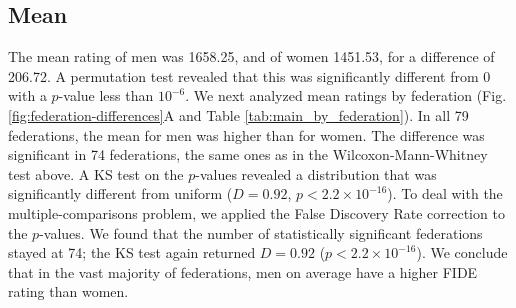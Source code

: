\documentclass[9pt,twocolumn,twoside,lineno]{pnas-new}
\begin{document}
\subsection*{Mean}
The mean rating of men was 1658.25, and of women 1451.53, for a difference of 206.72.  A permutation test revealed that this was significantly different from 0 with a $p$-value less than $10^{-6}$.  We next analyzed mean ratings by federation (Fig. \ref{fig:federation-differences}A and Table \ref{tab:main_by_federation}). In all 79 federations, the mean for men was higher than for women. The difference was significant in 74  federations, the same ones as in the Wilcoxon-Mann-Whitney test above. A KS test on the $p$-values revealed a distribution that was significantly different from uniform ($D = 0.92$, $p < 2.2\times 10^{-16}$). To deal with the multiple-comparisons problem, we applied the False Discovery Rate correction \cite{BH95} to the $p$-values. We found that the number of statistically significant federations stayed at 74; the KS test again returned $D = 0.92$ ($p < 2.2\times 10^{-16}$). We conclude that in the vast majority of federations, men on average have a higher FIDE rating than women.
\end{document}
